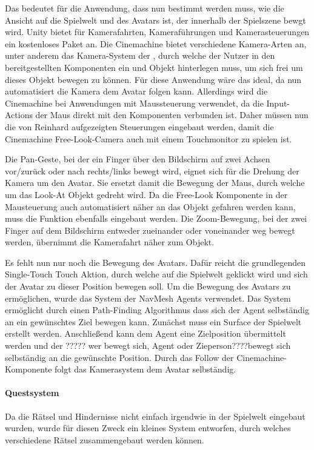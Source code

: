 Das bedeutet für die Anwendung, dass nun bestimmt werden muss, wie die Ansicht auf die Spielwelt und des Avatars ist, der innerhalb der Spielszene bewgt wird. Unity bietet für Kamerafahrten, Kameraführungen und Kamerasteuerungen ein kostenloses Paket an. Die Cinemachine bietet verschiedene Kamera-Arten an, unter anderem das Kamera-System der , durch welche der Nutzer in den bereitgestellten Komponenten ein  und  Objekt hinterlegen muss, um sich frei um dieses Objekt bewegen zu können. Für diese Anwendung wäre das ideal, da nun automatisiert die Kamera dem Avatar folgen kann. Allerdings wird die Cinemachine bei Anwendungen mit Maussteuerung verwendet, da die Input-Actions der Maus direkt mit den Komponenten verbunden ist. Daher müssen nun die von Reinhard aufgezeigten Steuerungen eingebaut werden, damit die Cinemachine Free-Look-Camera auch mit einem Touchmonitor zu spielen ist. 

Die Pan-Geste, bei der ein Finger über den Bildschirm auf zwei Achsen vor/zurück oder nach rechts/links bewegt wird, eignet sich für die Drehung der Kamera um den Avatar. Sie ersetzt damit die Bewegung der Maus, durch welche um das Look-At Objekt gedreht wird. Da die Free-Look Komponente in der Mausteuerung auch automatisiert näher an das Objekt gefahren werden kann, muss die Funktion ebenfalls eingebaut werden. Die Zoom-Bewegung, bei der zwei Finger auf dem Bildschirm entweder zueinander oder voneinander weg bewegt werden, übernimmt die Kamerafahrt näher zum Objekt.

Es fehlt nun nur noch die Bewegung des Avatars. Dafür reicht die grundlegenden Single-Touch Touch Aktion, durch welche auf die Spielwelt geklickt wird und sich der Avatar zu dieser Position bewegen soll. Um die Bewegung des Avatars zu ermöglichen, wurde das System der NavMesh Agents verwendet. Das System ermöglicht durch einen Path-Finding Algorithmus dass sich der Agent selbständig an ein gewünschtes Ziel bewegen kann. Zunächst muss ein Surface der Spielwelt erstellt werden. Anschließend kann dem Agent eine Zielposition übermittelt werden und der ????? wer bewegt sich, Agent oder Zieperson????bewegt sich selbständig an die gewünschte Position. Durch das Follow der Cinemachine-Komponente folgt das Kamerasystem dem Avatar selbständig.

\paragraph{Questsystem}\label{sec:quest-system}
Da die Rätsel und Hindernisse nicht einfach irgendwie in der Spielwelt eingebaut wurden, wurde für diesen Zweck ein kleines System entworfen, durch welches verschiedene Rätsel zusammengebaut werden können.

